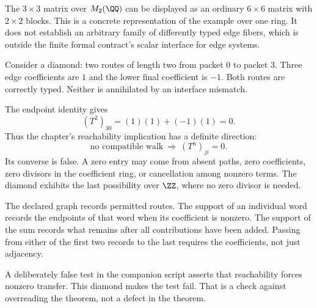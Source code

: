 The $3\times3$ matrix over $M_2(\QQ)$ can be displayed as an ordinary $6\times6$ matrix with $2\times2$ blocks. This is a concrete representation of the example over one ring. It does not establish an arbitrary family of differently typed edge fibers, which is outside the finite formal contract's scalar interface for edge systems.


Consider a diamond: two routes of length two from packet $0$ to packet $3$. Three edge coefficients are $1$ and the lower final coefficient is $-1$. Both routes are correctly typed. Neither is annihilated by an interface mismatch.


The endpoint identity gives
\[
(T^2)_{30}=(1)(1)+(-1)(1)=0.
\]
Thus the chapter's reachability implication has a definite direction:
\[
\text{no compatible walk}\ \Longrightarrow\ (T^n)_{ji}=0.
\]
Its converse is false. A zero entry may come from absent paths, zero coefficients, zero divisors in the coefficient ring, or cancellation among nonzero terms. The diamond exhibits the last possibility over $\ZZ$, where no zero divisor is needed.

The declared graph records permitted routes. The support of an individual word records the endpoints of that word when its coefficient is nonzero. The support of the sum records what remains after all contributions have been added. Passing from either of the first two records to the last requires the coefficients, not just adjacency.

A deliberately false test in the companion script asserts that reachability forces nonzero transfer. This diamond makes the test fail. That is a check against overreading the theorem, not a defect in the theorem.


